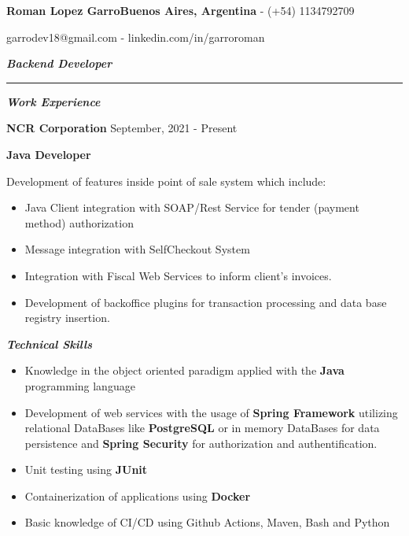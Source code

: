 \documentclass{article}
\begin{document}
\fontsize{18pt}{0pt}
\noindent\textbf{Roman Lopez Garro}\hfill\fontsize{10pt}{0pt}\textbf{Buenos Aires, Argentina} - (+54) 1134792709

\hfill garrodev18@gmail.com - linkedin.com/in/garroroman

\vspace{1mm}

\fontsize{13pt}{0pt}
\noindent\textit{\textbf{Backend Developer}}
\par\noindent\rule{\textwidth}{0.4pt}

\vspace{4mm}
\fontsize{12pt}{0pt}
\begin{center}
    \textit{\textbf{Work Experience}}
\end{center}

\vspace{1mm}
\setlength{\parindent}{11pt}\fontsize{10pt}{0pt}\textbf{NCR Corporation} \hfill September, 2021 - Present

\vspace{1mm}
\setlength{\parindent}{11pt}\fontsize{10pt}{0pt}\textbf{Java Developer}

\vspace{4mm}
\indent Development of features inside point of sale system which include:
\begin{itemize}
    \item Java Client integration with SOAP/Rest Service for tender (payment method) authorization
    \item Message integration with SelfCheckout System
    \item Integration with Fiscal Web Services to inform client's invoices.
    \item Development of backoffice plugins for transaction processing and data base registry insertion.
\end{itemize}

\vspace{4mm}
\fontsize{12pt}{0pt}
\begin{center}
    \textit{\textbf{Technical Skills}}
\end{center}

\fontsize{9pt}{0pt}
\noindent
\begin{itemize}
    \item Knowledge in the object oriented paradigm applied with the \textbf{Java} programming language

    \item Development of web services with the usage of \textbf{Spring Framework} utilizing relational DataBases like \textbf{PostgreSQL} or in memory DataBases for data persistence and \textbf{Spring Security} for authorization and authentification.

    \item Unit testing using \textbf{JUnit}

    \item Containerization of applications using \textbf{Docker}

    \item Basic knowledge of CI/CD using Github Actions, Maven, Bash and Python
\end{itemize}
\end{document}
